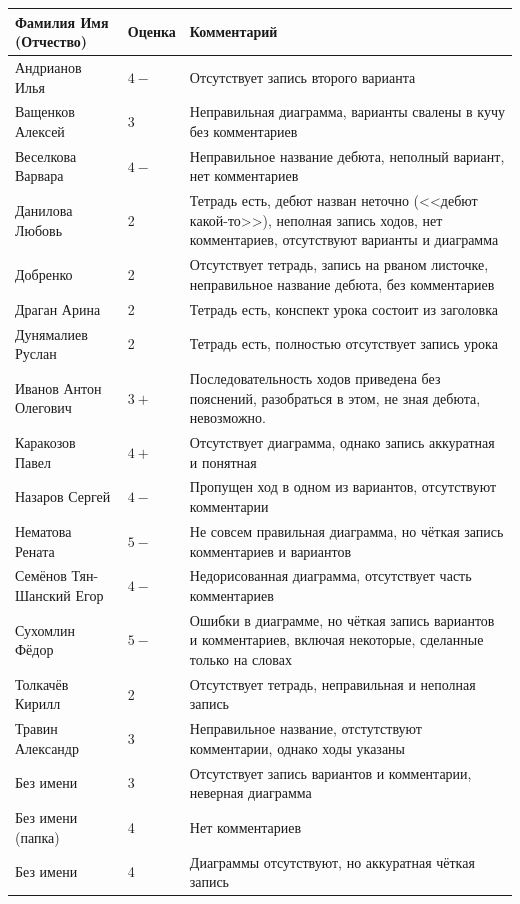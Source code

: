 \documentclass[10pt,a4paper]{article}
\begin{document}
\bigskip
\begin{tabular}{llp{10cm}}
Фамилия Имя (Отчество) & Оценка & Комментарий \\
\hline
Андрианов Илья & $4-$ & Отсутствует запись второго варианта\\
Ващенков Алексей & 3 & Неправильная диаграмма, варианты свалены в кучу без комментариев\\
Веселкова Варвара & $4-$ & Неправильное название дебюта, неполный вариант, нет комментариев\\
Данилова Любовь & 2 & Тетрадь есть, дебют назван неточно (<<дебют какой-то>>), неполная запись ходов, 
нет комментариев, отсутствуют варианты и диаграмма\\
Добренко & 2 & Отсутствует тетрадь, запись на рваном листочке, неправильное название дебюта, без комментариев\\
Драган Арина & 2 & Тетрадь есть, конспект урока состоит из заголовка\\
Дунямалиев Руслан & 2 & Тетрадь есть, полностью отсутствует запись урока\\
Иванов Антон Олегович & $3+$ & Последовательность ходов приведена без пояснений, 
                            разобраться в этом, не зная дебюта, невозможно.\\
Каракозов Павел & $4+$ & Отсутствует диаграмма, однако запись аккуратная и понятная\\
Назаров Сергей & $4-$ & Пропущен ход в одном из вариантов, отсутствуют комментарии\\
Нематова Рената & $5-$ & Не совсем правильная диаграмма, но чёткая запись комментариев и вариантов\\
Семёнов Тян-Шанский Егор & $4-$ & Недорисованная диаграмма, отсутствует часть комментариев\\
Сухомлин Фёдор & $5-$ & Ошибки в диаграмме, но чёткая запись вариантов и комментариев, включая некоторые, сделанные
                        только на словах\\
Толкачёв Кирилл & 2 & Отсутствует тетрадь, неправильная и неполная запись\\
Травин Александр & 3 & Неправильное название, отстутствуют комментарии, однако ходы указаны\\
Без имени  & 3 & Отсутствует запись вариантов и комментарии, неверная диаграмма\\
Без имени (папка)  & 4 & Нет комментариев\\
Без имени  & 4 & Диаграммы отсутствуют, но аккуратная чёткая запись\\
\hline
\end{tabular}
\end{document}
